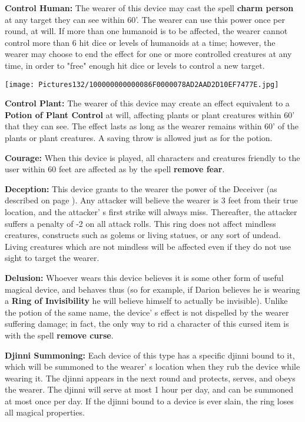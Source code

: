 \documentclass[a4paper,twoside,openany,10pt]{book}
\begin{document}
\begin{multicols}{2}
\textbf{Control Human:} The wearer of this device may cast the spell \textbf{charm person} at any target they can see within 60'. The wearer can use this power once per round, at will. If more than one humanoid is to be affected, the wearer cannot control more than 6 hit dice or levels of humanoids at a time; however, the wearer may choose to end the effect for one or more controlled creatures at any time, in order to "free" enough hit dice or levels to control a new target.

\begin{center}
	\texttt{[image: Pictures132/100000000000086F0000078AD2AAD2D10EF7477E.jpg]}
\end{center}

\textbf{Control Plant:} The wearer of this device may create an effect equivalent to a \textbf{Potion of Plant Control} at will, affecting plants or plant creatures within 60' that they can see. The effect lasts as long as the wearer remains within 60' of the plants or plant creatures. A saving throw is allowed just as for the potion.

\textbf{Courage: }When this device is played, all characters and creatures friendly to the user within 60 feet are affected as by the spell \textbf{remove fear}.

\textbf{Deception:} This device grants to the wearer the power of the Deceiver (as described on page \hyperlink{deceiver-panther-hydra}{\pageref{deceiver-panther-hydra}}). Any attacker will believe the wearer is 3 feet from their true location, and the attacker' s first strike will always miss. Thereafter, the attacker suffers a penalty of -2 on all attack rolls. This ring does not affect mindless creatures, constructs such as golems or living statues, or any sort of undead. Living creatures which are not mindless will be affected even if they do not use sight to target the wearer.

\textbf{Delusion:} Whoever wears this device believes it is some other form of useful magical device, and behaves thus (so for example, if Darion believes he is wearing a \textbf{Ring of Invisibility} he will believe himself to actually be invisible). Unlike the potion of the same name, the device' s effect is not dispelled by the wearer suffering damage; in fact, the only way to rid a character of this cursed item is with the spell \textbf{remove curse}.

\textbf{Djinni Summoning:} Each device of this type has a specific djinni bound to it, which will be summoned to the wearer' s location when they rub the device while wearing it. The djinni appears in the next round and protects, serves, and obeys the wearer. The djinni will serve at most 1 hour per day, and can be summoned at most once per day. If the djinni bound to a device is ever slain, the ring loses all magical properties.


\end{multicols}
\end{document}
